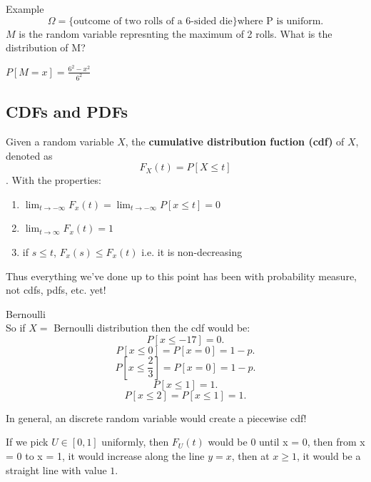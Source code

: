 \documentclass[a4paper]{article}
\begin{document}
\begin{note}{Example}
  \[
    \Omega = \{ \text{outcome of two rolls of a 6-sided die} \} \text{where P is uniform}
  .\] 
  $M$ is the random variable represnting the maximum of 2 rolls.
  What is the distribution of M?

  $P[M = x] = \frac{6^2 - x^2}{6^2}$
\end{note}

\subsection{CDFs and PDFs}
\begin{definition}
  Given a random variable $X$, the \textbf{cumulative distribution fuction (cdf)} of $X$, denoted as $$F_X (t) = P[X \leq t]$$.
  With the properties:
 
\begin{enumerate}
  \item $\lim_{t \to -\infty} F_x(t) = \lim_{t \to -\infty} P[x \leq t] = 0$
  \item $\lim_{t \to \infty} F_x(t) = 1$
  \item if $s \leq t$, $F_x(s) \leq F_x(t)$ i.e. it is non-decreasing 
\end{enumerate} 
\end{definition}


\begin{note}
  Thus everything we've done up to this point has been with probability measure, not cdfs, pdfs, etc. yet!
\end{note}  

\begin{note}{Bernoulli} \\
  So if $X=$ Bernoulli distribution then the cdf would be: \\
  \[
   P[x \leq -17] = 0
  .\] 
  \[
    P[x \leq 0] = P[x=0] = 1 - p 
  .\] 
  \[
    P[x \leq \frac{2}{3}] = P[x=0] = 1 -p 
  .\] 
  \[
    P[x \leq 1] = 1 
  .\] 
  \[
   P[x \leq 2] = P[x \leq 1] = 1
  .\] 
\end{note}
\begin{note}
  In general, an discrete random variable would create a piecewise cdf!
\end{note}

\begin{note}
  If we pick $U \in [0,1]$ uniformly, then $F_U (t)$ would be 0 until x = 0, then from x = 0 to x = 1, it would 
  increase along the line $y=x$, then at $x\geq1$, it would be a straight line with value $1$.
\end{note}
\end{document}
